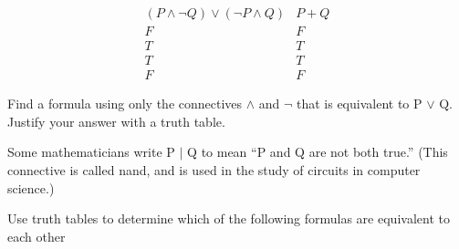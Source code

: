 \documentclass[addpoints,12pt]{exam}
\begin{document}
\begin{questions}
\begin{parts}
    \[
    \begin{array}{c|c}
    (P\land\neg Q)\lor(\neg P\land Q) & P+Q \\ \hline
    F & F \\
    T & T \\
    T & T \\
    F & F
    \end{array}
    \]
    
\end{parts}

\question Find a formula using only the connectives $\land$ and $\lnot$ that is equivalent
to P $\vee$ Q. Justify your answer with a truth table.

\question Some mathematicians write P $|$ Q to mean “P and Q are not both true.” (This connective is called nand, and is used in the study of circuits in computer science.) 

\begin{parts}
    \part 
    \[
    \begin{array}{c|c|c|c}
    P & Q & P\land Q & P\mid Q=\neg(P\land Q) \\ \hline
    T & T & T & F \\
    T & F & F & T \\
    F & T & F & T \\
    F & F & F & T
    \end{array}
    \]
\end{parts}

\question Use truth tables to determine which of the following formulas are equivalent to each other
\begin{parts}

\end{parts}
\end{questions}
\end{document}
